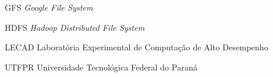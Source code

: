 
\begin{siglas} 
	\item [GFS] \textit{Google File System}
	
	\item [HDFS] \textit{Hadoop Distributed File System}
	  
    \item [LECAD] Laboratória Experimental de Computação de Alto Desempenho
    
    \item [UTFPR] Universidade Tecnológica Federal do Paraná
\end{siglas}

